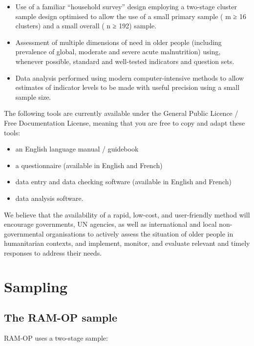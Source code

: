 \documentclass[12pt,]{book}
\theoremstyle{definition}
\theoremstyle{definition}
\theoremstyle{definition}
\theoremstyle{remark}
\begin{document}
\begin{itemize}
\item
  Use of a familiar ``household survey'' design employing a two-stage
  cluster sample design optimised to allow the use of a small primary
  sample ( m ≥ 16 clusters) and a small overall ( n ≥ 192) sample.
\item
  Assessment of multiple dimensions of need in older people (including
  prevalence of global, moderate and severe acute malnutrition) using,
  whenever possible, standard and well-tested indicators and question
  sets.
\item
  Data analysis performed using modern computer-intensive methods to
  allow estimates of indicator levels to be made with useful precision
  using a small sample size.
\end{itemize}

The following tools are currently available under the General Public
Licence / Free Documentation License, meaning that you are free to copy
and adapt these tools:

\begin{itemize}
\item
  an English language manual / guidebook
\item
  a questionnaire (available in English and French)
\item
  data entry and data checking software (available in English and
  French)
\item
  data analysis software.
\end{itemize}

We believe that the availability of a rapid, low-cost, and user-friendly
method will encourage governments, UN agencies, as well as international
and local non-governmental organisations to actively assess the
situation of older people in humanitarian contexts, and implement,
monitor, and evaluate relevant and timely responses to address their
needs.

\hypertarget{sampling}{%
\chapter{Sampling}\label{sampling}}

\hypertarget{the-ram-op-sample}{%
\section{The RAM-OP sample}\label{the-ram-op-sample}}

RAM-OP uses a two-stage sample:
\end{document}
